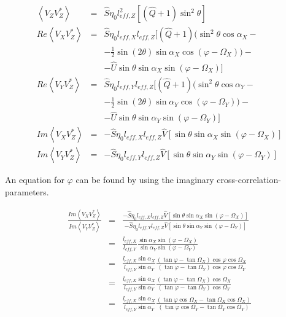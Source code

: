 \documentclass[a4paper,11pt]{report}
\begin{document}
\begin{eqnarray}
\left\langle V_Z V_Z^{*} \right\rangle &=& \hat{S}\eta_0 l_{eff,Z}^2[(\hat{Q}+1) \sin^2 \theta]   \\
Re \left\langle V_X V_Z^{*}\right\rangle &=& \hat{S}\eta_0 l_{eff,X} l_{eff,Z}[(\hat{Q}+1) (\sin^2 \theta \cos \alpha_X  - \\
& & - \frac{1}{2}  \sin(2\theta) \sin \alpha_X  \cos(\varphi - \Omega_X))  - \nonumber \\
& & -\hat{U} \sin \theta \sin \alpha_X  \sin (\varphi - \Omega_X)   ]\nonumber \\
Re \left\langle V_Y V_Z^{*}\right\rangle &=& \hat{S}\eta_0 l_{eff,Y} l_{eff,Z}[(\hat{Q}+1) (\sin^2 \theta \cos \alpha_Y  - \\
& & - \frac{1}{2}  \sin(2\theta) \sin \alpha_Y  \cos(\varphi - \Omega_Y))  - \nonumber \\
& & -\hat{U} \sin \theta \sin \alpha_Y  \sin (\varphi - \Omega_Y)   ]\nonumber \\
Im \left\langle V_X V_Z^{*}\right\rangle &=&  -\hat{S}\eta_0 l_{eff,X} l_{eff,Z} \hat{V}[ \sin \theta \sin \alpha_X  \sin (\varphi - \Omega_X) ] \\
Im \left\langle V_Y V_Z^{*}\right\rangle &=&  -\hat{S}\eta_0 l_{eff,Y} l_{eff,Z} \hat{V}[ \sin \theta \sin \alpha_Y  \sin (\varphi - \Omega_Y) ]
\end{eqnarray}


An equation for $\varphi$ can be found by using the imaginary cross-correlation-parameters.

\begin{eqnarray}
\frac{Im \left\langle V_X V_Z^{*}\right\rangle }{Im \left\langle V_Y V_Z^{*}\right\rangle}&=&\frac{- \hat{S}\eta_0 l_{eff,X} l_{eff,Z} \hat{V}[ \sin \theta \sin \alpha_X  \sin (\varphi - \Omega_X) ]}{- \hat{S}\eta_0 l_{eff,Y} l_{eff,Z} \hat{V}[ \sin \theta \sin \alpha_Y  \sin (\varphi - \Omega_Y) ] }\\
&=&\frac{l_{eff,X}}{l_{eff,Y}}\frac{ \sin \alpha_X  \sin (\varphi - \Omega_X) }{ \sin \alpha_Y  \sin (\varphi - \Omega_Y)  }\\
&=&\frac{l_{eff,X} \sin \alpha_X}{l_{eff,Y} \sin \alpha_Y}\frac{(\tan \varphi -\tan \Omega_X)  \cos \varphi \cos \Omega_X}{( \tan \varphi -\tan \Omega_Y) \cos \varphi \cos  \Omega_Y  }\\
&=&\frac{l_{eff,X} \sin \alpha_X}{l_{eff,Y} \sin \alpha_Y}\frac{(\tan \varphi -\tan \Omega_X)  \cos \Omega_X}{( \tan \varphi -\tan \Omega_Y) \cos  \Omega_Y  } \\
&=&\frac{l_{eff,X} \sin \alpha_X}{l_{eff,Y} \sin \alpha_Y}\frac{(\tan \varphi \cos \Omega_X-\tan \Omega_X \cos \Omega_X) }{( \tan \varphi \cos \Omega_Y-\tan \Omega_Y \cos \Omega_Y) }
\end{eqnarray}
\end{document}
